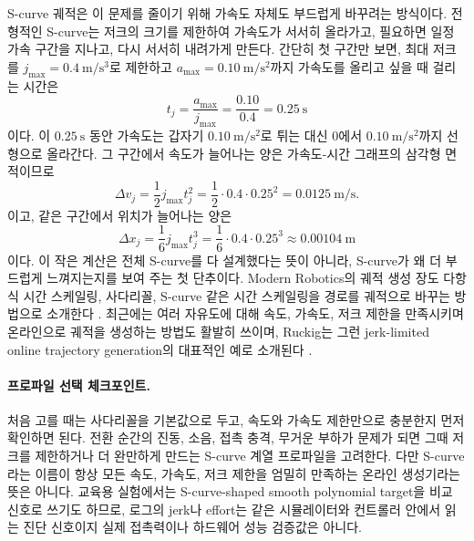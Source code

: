 S-curve 궤적은 이 문제를 줄이기 위해 가속도 자체도 부드럽게 바꾸려는 방식이다.
전형적인 S-curve는 저크의 크기를 제한하여 가속도가 서서히 올라가고, 필요하면 일정 가속 구간을 지나고, 다시 서서히 내려가게 만든다.
간단히 첫 구간만 보면, 최대 저크를 \(j_{\max}=0.4~\mathrm{m/s^3}\)로 제한하고 \(a_{\max}=0.10~\mathrm{m/s^2}\)까지 가속도를 올리고 싶을 때 걸리는 시간은
\begin{equation}
  t_j
  =
  \frac{a_{\max}}{j_{\max}}
  =
  \frac{0.10}{0.4}
  =
  0.25~\mathrm{s}
  \label{eq:s-curve-jerk-ramp-time}
\end{equation}
이다.
이 \(0.25~\mathrm{s}\) 동안 가속도는 갑자기 \(0.10~\mathrm{m/s^2}\)로 튀는 대신 \(0\)에서 \(0.10~\mathrm{m/s^2}\)까지 선형으로 올라간다.
그 구간에서 속도가 늘어나는 양은 가속도-시간 그래프의 삼각형 면적이므로
\begin{equation}
  \Delta v_j
  =
  \frac{1}{2}j_{\max}t_j^2
  =
  \frac{1}{2}\cdot0.4\cdot0.25^2
  =
  0.0125~\mathrm{m/s}.
  \label{eq:s-curve-jerk-ramp-dv}
\end{equation}
이고, 같은 구간에서 위치가 늘어나는 양은
\begin{equation}
  \Delta x_j
  =
  \frac{1}{6}j_{\max}t_j^3
  =
  \frac{1}{6}\cdot0.4\cdot0.25^3
  \approx
  0.00104~\mathrm{m}
  \label{eq:s-curve-jerk-ramp-dx}
\end{equation}
이다.
이 작은 계산은 전체 S-curve를 다 설계했다는 뜻이 아니라, S-curve가 왜 더 부드럽게 느껴지는지를 보여 주는 첫 단추이다.
Modern Robotics의 궤적 생성 장도 다항식 시간 스케일링, 사다리꼴, S-curve 같은 시간 스케일링을 경로를 궤적으로 바꾸는 방법으로 소개한다 \cite{lynchpark2017modernrobotics}.
최근에는 여러 자유도에 대해 속도, 가속도, 저크 제한을 만족시키며 온라인으로 궤적을 생성하는 방법도 활발히 쓰이며, Ruckig는 그런 jerk-limited online trajectory generation의 대표적인 예로 소개된다 \cite{berscheid2021ruckig}.

\paragraph{프로파일 선택 체크포인트.}
%
처음 고를 때는 사다리꼴을 기본값으로 두고, 속도와 가속도 제한만으로 충분한지 먼저 확인하면 된다.
%
전환 순간의 진동, 소음, 접촉 충격, 무거운 부하가 문제가 되면 그때 저크를 제한하거나 더 완만하게 만드는 S-curve 계열 프로파일을 고려한다.
%
다만 S-curve라는 이름이 항상 모든 속도, 가속도, 저크 제한을 엄밀히 만족하는 온라인 생성기라는 뜻은 아니다.
%
교육용 실험에서는 S-curve-shaped smooth polynomial target을 비교 신호로 쓰기도 하므로, 로그의 jerk나 effort는 같은 시뮬레이터와 컨트롤러 안에서 읽는 진단 신호이지 실제 접촉력이나 하드웨어 성능 검증값은 아니다.
%
%


